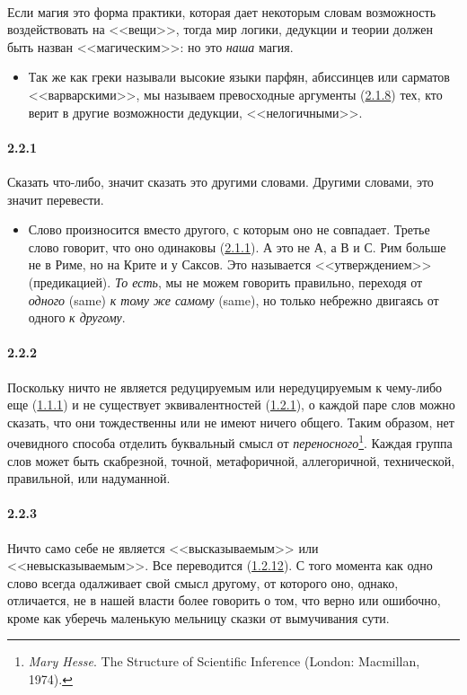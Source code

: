 \paragraph{}\hypertarget{par:}{} Если магия это форма практики, которая дает некоторым словам возможность воздействовать на <<вещи>>, тогда мир логики, дедукции и теории должен быть назван <<магическим>>: но это {\itshape наша} магия. 
	\begin{itemize}
	\item 
	Так же как греки называли высокие языки парфян, абиссинцев или сарматов <<варварскими>>, мы называем превосходные аргументы (\hyperlink{par:2.1.8}{2.1.8}) тех, кто верит в другие возможности дедукции, <<нелогичными>>.
	\end{itemize}

\paragraph{2.2.1}\hypertarget{par:2.2.1}{} Сказать что-либо, значит сказать это другими словами. Другими словами, это значит перевести.
	\begin{itemize}
	\item 
	Слово произносится вместо другого, с которым оно не совпадает. Третье слово говорит, что оно одинаковы (\hyperlink{par:2.1.1}{2.1.1}). А это не А, а В и С. Рим больше не в Риме, но на Крите и у Саксов. Это называется <<утверждением>> (предикацией). {\itshape То есть}, мы не можем говорить правильно, переходя от {\itshape одного} (same) {\itshape к тому же самому} (same), но только небрежно двигаясь от одного {\itshape к другому}.
	\end{itemize}

\paragraph{2.2.2}\hypertarget{par:2.2.2}{} Поскольку ничто не является редуцируемым или нередуцируемым к чему-либо еще (\hyperlink{par:1.1.1}{1.1.1}) и не существует эквивалентностей (\hyperlink{par:1.2.1}{1.2.1}), о каждой паре слов можно сказать, что они тождественны или не имеют ничего общего. Таким образом, нет очевидного способа отделить буквальный смысл от {\itshape переносного}\footnote{{\itshape Mary Hesse}. The Structure of Scientific Inference (London: Macmillan, 1974).}. Каждая группа слов может быть скабрезной, точной, метафоричной, аллегоричной, технической, правильной, или надуманной.

\paragraph{2.2.3}\hypertarget{par:2.2.3}{} Ничто само себе не является <<высказываемым>> или <<невысказываемым>>. Все переводится (\hyperlink{par:1.2.12}{1.2.12}). С того момента как одно слово всегда одалживает свой смысл другому, от которого оно, однако, отличается, не в нашей власти более говорить о том, что верно или ошибочно, кроме как уберечь маленькую мельницу сказки от вымучивания сути.

